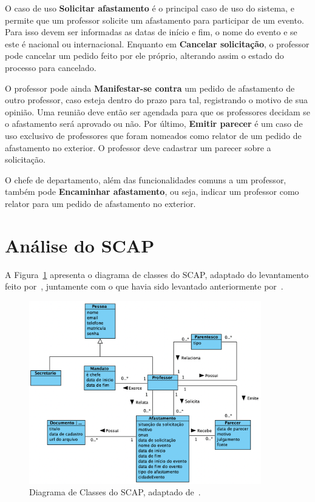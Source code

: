 O caso de uso \textbf{Solicitar afastamento} é o principal caso de uso do sistema, e permite
que um professor solicite um afastamento para participar de um evento. Para isso devem ser informadas
as datas de início e fim, o nome do evento e se este é nacional ou internacional. 
Enquanto em \textbf{Cancelar solicitação}, o professor pode cancelar um pedido feito por ele próprio,
alterando assim o estado do processo para cancelado.

O professor pode ainda \textbf{Manifestar-se contra} um pedido de afastamento de 
outro professor, caso esteja dentro do prazo para tal, registrando o motivo de sua opinião.
Uma reunião deve então ser agendada para que os professores decidam se o afastamento será aprovado ou não.
Por último, \textbf{Emitir parecer} é um caso de uso exclusivo de professores que foram nomeados
como relator de um pedido de afastamento no exterior. O professor deve cadastrar um parecer sobre a solicitação.

O chefe de departamento, além das funcionalidades comuns a um professor, também pode \textbf{Encaminhar afastamento},
ou seja, indicar um professor como relator para um pedido de afastamento no exterior. 


\section{Análise do SCAP}
\label{sec-espec-analise-scap}

A Figura~\ref{fig:diagrama-classes} apresenta o diagrama de classes do SCAP, adaptado
do levantamento feito por~, juntamente com o que havia sido
levantado anteriormente por~.

\begin{figure}
    \centering  
    \includegraphics[width=0.9\textwidth]{figuras/fig-diagrama-classes.png}
    \caption{Diagrama de Classes do SCAP, adaptado de~\cite{prado:2015}.}
    \label{fig:diagrama-classes}
\end{figure}

